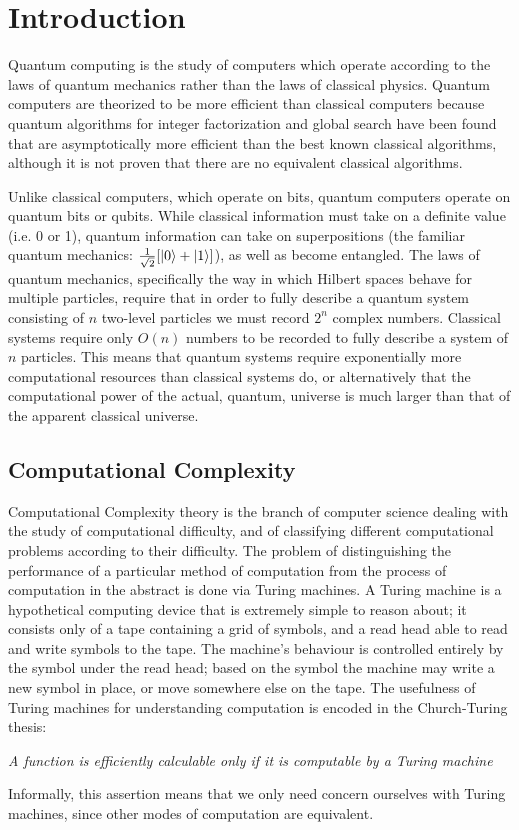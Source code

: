 \chapter{Introduction}
Quantum computing is the study of computers which operate according to the laws of quantum mechanics rather than the laws of classical physics.  Quantum computers are theorized to be more efficient than classical computers because quantum algorithms for integer factorization\cite{shor} and global search\cite{grover} have been found that are asymptotically more efficient than the best known classical algorithms, although it is not proven that there are no equivalent classical algorithms.

Unlike classical computers, which operate on bits, quantum computers operate on quantum bits or qubits.  While classical information must take on a definite value (i.e. 0 or 1), quantum information can take on superpositions (the familiar quantum mechanics: $\frac{1}{\sqrt{2}}[\mathinner{|{0}\rangle} + \mathinner{|{1}\rangle}]$), as well as become entangled.  The laws of quantum mechanics, specifically the way in which Hilbert spaces behave for multiple particles, require that in order to fully describe a quantum system consisting of $n$ two-level particles we must record $2^n$ complex numbers.  Classical systems require only $O(n)$ numbers to be recorded to fully describe a system of $n$ particles.  This means that quantum systems require exponentially more computational resources than classical systems do, or alternatively that the computational power of the actual, quantum, universe is much larger than that of the apparent classical universe.

\section{Computational Complexity}
\label{sec:complex}
Computational Complexity theory is the branch of computer science dealing with the study of computational difficulty, and of classifying different computational problems according to their difficulty.  The problem of distinguishing the performance of a particular method of computation from the process of computation in the abstract is done via Turing machines.\cite{turing}  A Turing machine is a hypothetical computing device that is extremely simple to reason about; it consists only of a tape containing a grid of symbols, and a read head able to read and write symbols to the tape.  The machine's behaviour is controlled entirely by the symbol under the read head; based on the symbol the machine may write a new symbol in place, or move somewhere else on the tape.  The usefulness of Turing machines for understanding computation is encoded in the Church-Turing thesis:
\begin{center}
	\emph{A function is efficiently calculable only if it is computable by a Turing machine}
\end{center}
Informally, this assertion means that we only need concern ourselves with Turing machines, since other modes of computation are equivalent.

